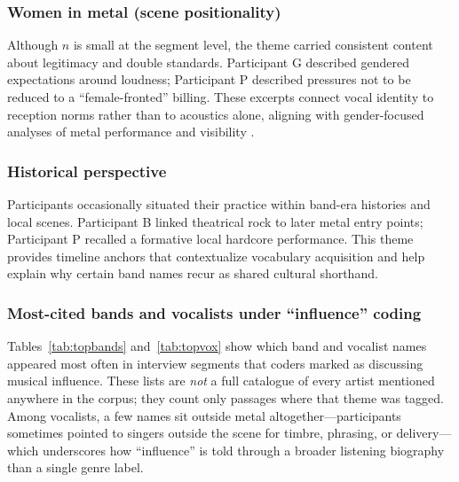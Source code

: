 \documentclass{article}
\begin{document}
\subsubsection{Women in metal (scene positionality)}
Although \(n\) is small at the segment level, the theme carried consistent content about legitimacy and double standards.
Participant G described gendered expectations around loudness; Participant P described pressures not to be reduced to a ``female-fronted'' billing.
These excerpts connect vocal identity to reception norms rather than to acoustics alone, aligning with gender-focused analyses of metal performance and visibility \parencite{Herbst2017VoiceOfAnarchy}.

\subsubsection{Historical perspective}
Participants occasionally situated their practice within band-era histories and local scenes.
Participant B linked theatrical rock to later metal entry points; Participant P recalled a formative local hardcore performance.
This theme provides timeline anchors that contextualize vocabulary acquisition and help explain why certain band names recur as shared cultural shorthand.

\subsubsection{Most-cited bands and vocalists under ``influence'' coding}
Tables~\ref{tab:topbands} and~\ref{tab:topvox} show which band and vocalist names appeared most often in interview segments that coders marked as discussing musical influence.
These lists are \emph{not} a full catalogue of every artist mentioned anywhere in the corpus; they count only passages where that theme was tagged.
Among vocalists, a few names sit outside metal altogether---participants sometimes pointed to singers outside the scene for timbre, phrasing, or delivery---which underscores how ``influence'' is told through a broader listening biography than a single genre label.
\end{document}
